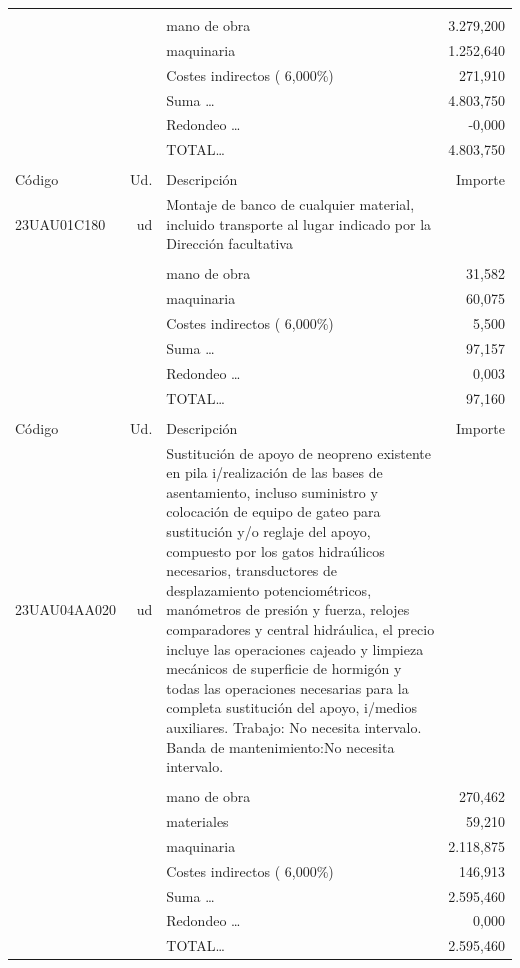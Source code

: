 \documentclass{book}%
\begin{document}
\begin{supertabular}{l r p{60mm} r}
&&&\\%
&&mano de obra& 3.279,200\\%
&&maquinaria& 1.252,640\\%
&&Costes indirectos (     6,000\%)&   271,910\\%
&&Suma \ldots& 4.803,750\\%
&&Redondeo \ldots&    {-}0,000\\%
%
&&TOTAL\ldots& 4.803,750\\%
&&&\\%
Código&Ud.&Descripción&Importe\\%
\hline%
23UAU01C180&ud&Montaje de banco de cualquier material, incluido transporte al lugar indicado por la Dirección facultativa&\\%
&&&\\%
&&mano de obra&    31,582\\%
&&maquinaria&    60,075\\%
&&Costes indirectos (     6,000\%)&     5,500\\%
&&Suma \ldots&    97,157\\%
&&Redondeo \ldots&     0,003\\%
%
&&TOTAL\ldots&    97,160\\%
&&&\\%
Código&Ud.&Descripción&Importe\\%
\hline%
23UAU04AA020&ud&Sustitución de apoyo de neopreno existente en pila i/realización de las bases de asentamiento, incluso suministro y colocación de equipo de gateo para sustitución y/o reglaje del apoyo, compuesto por los gatos hidraúlicos necesarios, transductores de desplazamiento potenciométricos, manómetros de presión y fuerza, relojes comparadores y central hidráulica, el precio incluye las operaciones cajeado y limpieza mecánicos de superficie de hormigón y todas las operaciones necesarias para la completa sustitución del apoyo, i/medios auxiliares. Trabajo: No necesita intervalo. Banda de mantenimiento:No necesita intervalo.&\\%
&&&\\%
&&mano de obra&   270,462\\%
&&materiales&    59,210\\%
&&maquinaria& 2.118,875\\%
&&Costes indirectos (     6,000\%)&   146,913\\%
&&Suma \ldots& 2.595,460\\%
&&Redondeo \ldots&     0,000\\%
%
&&TOTAL\ldots& 2.595,460\\%

\end{supertabular}
\end{document}
